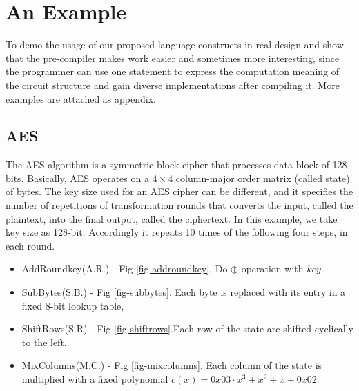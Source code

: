 \section{An Example}\label{sec:examples}
To demo the usage of our proposed language constructs in real design and show that the pre-compiler makes work easier and sometimes more interesting, since the programmer can use one statement to express the computation meaning of the circuit structure and gain diverse implementations after compiling it. More examples are attached as appendix.
\subsection{AES}
The AES\cite{AES} algorithm is a symmetric block cipher that processes data block of 128 bits.
Basically, AES operates on a \begin{math} 4 \times 4 \end{math} column-major order matrix (called state) of bytes. The key size used for an AES cipher can be different, and it specifies the number of repetitions of transformation rounds that converts the input, called the plaintext, into the final output, called the ciphertext. 
In this example, we take key size as 128-bit. Accordingly it repeats 10 times of the following four steps, in each round.
\begin{itemize}
  \item AddRoundkey(A.R.) - Fig \ref{fig-addroundkey}. Do $\oplus$ operation with $key$.
  \item SubBytes(S.B.) - Fig \ref{fig-subbytes}. Each byte is replaced with its entry in a fixed 8-bit 
        lookup table,
  \item ShiftRows(S.R) - Fig \ref{fig-shiftrows}.Each row of the state are shifted cyclically to the 
        left.
  \item MixColumns(M.C.) - Fig \ref{fig-mixcolumns}. Each column of the state is multiplied with a fixed polynomial 
        $c(x) = 0x03\cdot x^3 + x^2 + x + 0x02$.
\end{itemize}
